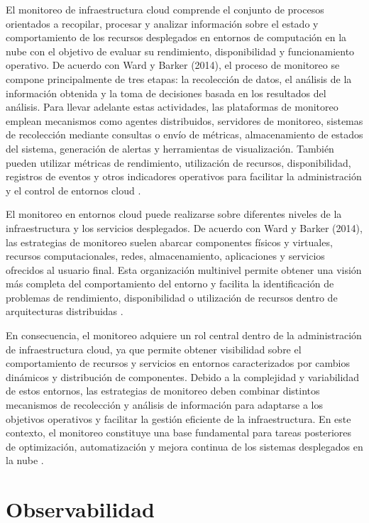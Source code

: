 El monitoreo de infraestructura cloud comprende el conjunto de procesos orientados a recopilar, procesar y analizar información sobre el estado y comportamiento de los recursos desplegados en entornos de computación en la nube con el objetivo de evaluar su rendimiento, disponibilidad y funcionamiento operativo. De acuerdo con Ward y Barker (2014), el proceso de monitoreo se compone principalmente de tres etapas: la recolección de datos, el análisis de la información obtenida y la toma de decisiones basada en los resultados del análisis. Para llevar adelante estas actividades, las plataformas de monitoreo emplean mecanismos como agentes distribuidos, servidores de monitoreo, sistemas de recolección mediante consultas o envío de métricas, almacenamiento de estados del sistema, generación de alertas y herramientas de visualización. También pueden utilizar métricas de rendimiento, utilización de recursos, disponibilidad, registros de eventos y otros indicadores operativos para facilitar la administración y el control de entornos cloud \parencite{Ward2014}.

El monitoreo en entornos cloud puede realizarse sobre diferentes niveles de la infraestructura y los servicios desplegados. De acuerdo con Ward y Barker (2014), las estrategias de monitoreo suelen abarcar componentes físicos y virtuales, recursos computacionales, redes, almacenamiento, aplicaciones y servicios ofrecidos al usuario final. Esta organización multinivel permite obtener una visión más completa del comportamiento del entorno y facilita la identificación de problemas de rendimiento, disponibilidad o utilización de recursos dentro de arquitecturas distribuidas \parencite{Ward2014}.

En consecuencia, el monitoreo adquiere un rol central dentro de la administración de infraestructura cloud, ya que permite obtener visibilidad sobre el comportamiento de recursos y servicios en entornos caracterizados por cambios dinámicos y distribución de componentes. Debido a la complejidad y variabilidad de estos entornos, las estrategias de monitoreo deben combinar distintos mecanismos de recolección y análisis de información para adaptarse a los objetivos operativos y facilitar la gestión eficiente de la infraestructura. En este contexto, el monitoreo constituye una base fundamental para tareas posteriores de optimización, automatización y mejora continua de los sistemas desplegados en la nube \parencite{Ward2014}.

\section{Observabilidad}

